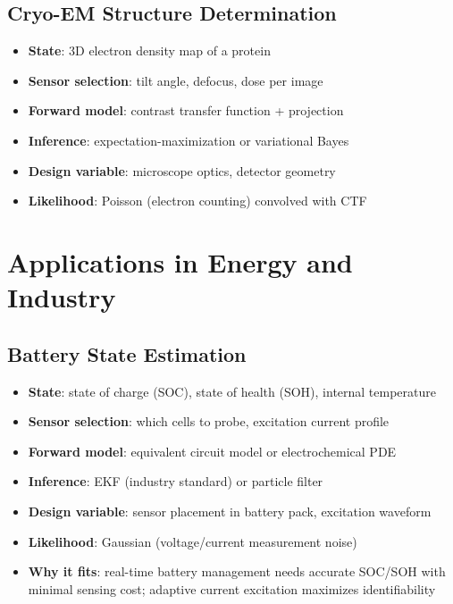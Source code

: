\documentclass[11pt,a4paper]{article}
\begin{document}
\subsection{Cryo-EM Structure Determination}

\begin{itemize}[nosep]
  \item \textbf{State}: 3D electron density map of a protein
  \item \textbf{Sensor selection}: tilt angle, defocus, dose per image
  \item \textbf{Forward model}: contrast transfer function + projection
  \item \textbf{Inference}: expectation-maximization or variational Bayes
  \item \textbf{Design variable}: microscope optics, detector geometry
  \item \textbf{Likelihood}: Poisson (electron counting) convolved with CTF
\end{itemize}

\section{Applications in Energy and Industry}

\subsection{Battery State Estimation}

\begin{itemize}[nosep]
  \item \textbf{State}: state of charge (SOC), state of health (SOH), internal temperature
  \item \textbf{Sensor selection}: which cells to probe, excitation current profile
  \item \textbf{Forward model}: equivalent circuit model or electrochemical PDE
  \item \textbf{Inference}: EKF (industry standard) or particle filter
  \item \textbf{Design variable}: sensor placement in battery pack, excitation waveform
  \item \textbf{Likelihood}: Gaussian (voltage/current measurement noise)
  \item \textbf{Why it fits}: real-time battery management needs accurate SOC/SOH with minimal sensing cost; adaptive current excitation maximizes identifiability
\end{itemize}
\end{document}
